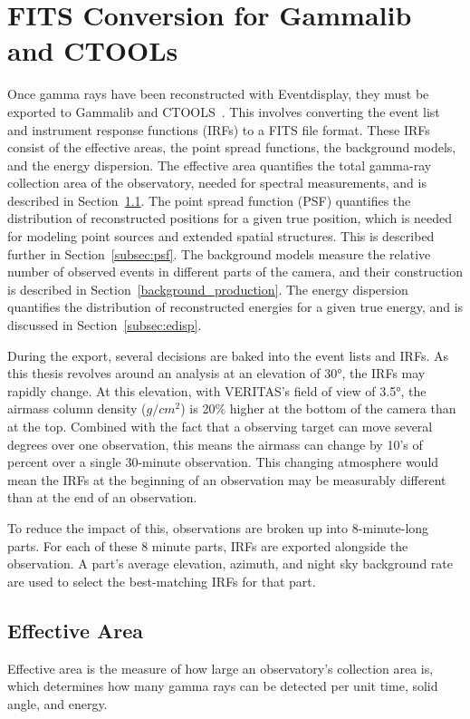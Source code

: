 \section{FITS Conversion for Gammalib and CTOOLs}\label{fitsconversion}
  Once gamma rays have been reconstructed with Eventdisplay, they must be exported to Gammalib and CTOOLS~\cite{gammalibctools}.
  This involves converting the event list and instrument response functions (IRFs) to a FITS file format.
  These IRFs consist of the effective areas, the point spread functions, the background models, and the energy dispersion.
  The effective area quantifies the total gamma-ray collection area of the observatory, needed for spectral measurements, and is described in Section~\ref{subsec:effarea}.
  The point spread function (PSF) quantifies the distribution of reconstructed positions for a given true position, which is needed for modeling point sources and extended spatial structures.
  This is described further in Section~\ref{subsec:psf}.
  The background models measure the relative number of observed events in different parts of the camera, and their construction is described in Section~\ref{background_production}.
  The energy dispersion quantifies the distribution of reconstructed energies for a given true energy, and is discussed in Section~\ref{subsec:edisp}.
  
  During the export, several decisions are baked into the event lists and IRFs.
  As this thesis revolves around an analysis at an elevation of \nicetilde{}\ang{30}, the IRFs may rapidly change.
  At this elevation, with VERITAS's field of view of \ang{3.5}, the airmass column density ($g/cm^{2}$) is 20\% higher at the bottom of the camera than at the top.
  Combined with the fact that a observing target can move several degrees over one observation, this means the airmass can change by 10's of percent over a single 30-minute observation.
  This changing atmosphere would mean the IRFs at the beginning of an observation may be measurably different than at the end of an observation.

  To reduce the impact of this, observations are broken up into 8-minute-long parts.
  For each of these 8 minute parts, IRFs are exported alongside the observation.
  A part's average elevation, azimuth, and night sky background rate are used to select the best-matching IRFs for that part.

  \FloatBarrier
  
  \subsection{Effective Area}\label{subsec:effarea}
    Effective area is the measure of how large an observatory's collection area is, which determines how many gamma rays can be detected per unit time, solid angle, and energy.

